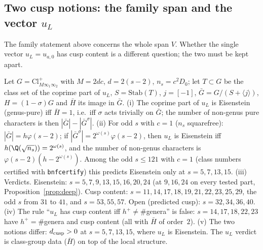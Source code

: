 \subsection{Two cusp notions: the family span and the vector $u_L$}
The family statement above concerns the whole span $V$. Whether the single vector $u_L=u_{a,0}$ has cusp content is a different question; the two must be kept apart.
\begin{proposition}\label{prop:cuspcrit}
Let $G=\mathrm{Cl}^+_{M\infty_1\infty_2}$ with $M=2dc$, $d=2(s-2)$, $n_s=c^2D_0$; let $T\subset G$ be the class set of the coprime part of $u_L$, $S=\mathrm{Stab}(T)$,
$j=[-1]$, $\bar G=G/(S+\langle j\rangle)$, $H=(1-\sigma)G$ and $\bar H$ its image in $\bar G$.
(i) The coprime part of $u_L$ is Eisenstein (genus-pure) iff $\bar H=1$, i.e.\ iff $\sigma$ acts trivially on $\bar G$; the number of non-genus pure characters is
then $|\bar G|-|\bar G^\sigma|$.
(ii) For odd $s$ with $c=1$ ($n_s$ squarefree): $|\bar G|=h\varphi(s-2)$; if $|\bar G^\sigma|=2^{\omega(s)}\varphi(s-2)$, then $u_L$ is Eisenstein iff $h(\Q(\sqrt{n_s}))=2^{\omega(s)}$, and the
number of non-genus characters is $\varphi(s-2)(h-2^{\omega(s)})$. Among the odd $s\le121$ with $c=1$ (class numbers certified with \texttt{bnfcertify}) this predicts Eisenstein only at $s=5,7,13,15$.
(iii) Verdicts. Eisenstein: $s=5,7,9,13,15,16,20,24$ (at $9,16,24$ on every tested part, Proposition~\ref{prop:deep}). Cusp content: $s=11,14,17,18,19,21,22,23,25,29$,
the odd $s$ from $31$ to $41$, and $s=53,55,57$. Open (predicted cusp): $s=32,34,36,40$.
(iv) The rule ``$u_L$ has cusp content iff $h^+\neq\#$genera'' is false: $s=14,17,18,22,23$ have $h^+=\#$genera and cusp content (all with $\bar H$ of order~$2$).
(v) The two notions differ: $d_{\rm cusp}>0$ at $s=5,7,13,15$, where $u_L$ is Eisenstein. The $u_L$ verdict is class-group data ($\bar H$) on top of the local structure.
\end{proposition}


